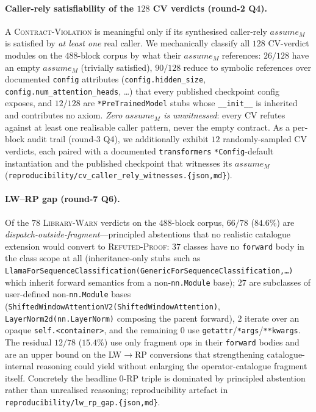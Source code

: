 \paragraph{Caller-rely satisfiability of the $128$ \textsc{CV} verdicts (round-2 Q4).}
A \textsc{Contract-Violation} is meaningful only if its synthesised
caller-rely $\mathit{assume}_M$ is satisfied by \emph{at least one}
real caller. We mechanically classify all $128$ CV-verdict modules
on the $488$-block corpus by what their $\mathit{assume}_M$
references: $26/128$ have an empty $\mathit{assume}_M$ (trivially
satisfied), $90/128$ reduce to symbolic references over documented
\texttt{config} attributes (\texttt{config.hidden\_size},
\texttt{config.num\_attention\_heads}, \dots) that every published
checkpoint config exposes, and $12/128$ are
\texttt{*PreTrainedModel} stubs whose \texttt{\_\_init\_\_} is
inherited and contributes no axiom. \emph{Zero $\mathit{assume}_M$ is
unwitnessed}: every CV refutes against at least one realisable
caller pattern, never the empty contract.  As a per-block audit
trail (round-3 Q4), we additionally exhibit $12$ randomly-sampled
CV verdicts, each paired with a documented \texttt{transformers}
\texttt{*Config}-default instantiation and the published checkpoint
that witnesses its $\mathit{assume}_M$
(\texttt{reproducibility/cv\_caller\_rely\_witnesses.\{json,md\}}).

\paragraph{LW--RP gap (round-7 Q6).}  Of the $78$
\textsc{Library-Warn} verdicts on the $488$-block corpus,
$66/78$ ($84.6\%$) are
\emph{dispatch-outside-fragment}---principled abstentions that no
realistic catalogue extension would convert to \textsc{Refuted-Proof}:
$37$ classes have no \texttt{forward} body in the class scope at all
(inheritance-only stubs such as
\texttt{LlamaForSequenceClassification(GenericForSequenceClassification,\dots)}
which inherit forward semantics from a non-\texttt{nn.Module} base);
$27$ are subclasses of user-defined non-\texttt{nn.Module} bases
(\texttt{ShiftedWindowAttentionV2(ShiftedWindowAttention)},
\texttt{LayerNorm2d(nn.LayerNorm)} composing the parent forward),
$2$ iterate over an opaque \texttt{self.<container>}, and the
remaining $0$ use \texttt{getattr}/\texttt{*args}/\texttt{**kwargs}.
The residual $12/78$ ($15.4\%$) use only fragment ops in their
\texttt{forward} bodies and are an upper bound on the
\textsc{LW}$\to$\textsc{RP} conversions that strengthening
catalogue-internal reasoning could yield without enlarging the
operator-catalogue fragment itself. Concretely the headline
$0$-RP triple is dominated by principled abstention rather than
unrealised reasoning; reproducibility artefact in
\texttt{reproducibility/lw\_rp\_gap.\{json,md\}}.

